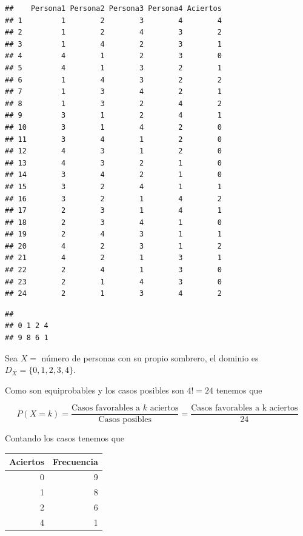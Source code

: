 \documentclass[
]{article}
\newenvironment{Shaded}{\begin{snugshade}}{\end{snugshade}}
\newcommand{\KeywordTok}[1]{\textcolor[rgb]{0.13,0.29,0.53}{\textbf{#1}}}
\newcommand{\NormalTok}[1]{#1}
\newcommand{\OperatorTok}[1]{\textcolor[rgb]{0.81,0.36,0.00}{\textbf{#1}}}
\begin{document}
\begin{verbatim}
##    Persona1 Persona2 Persona3 Persona4 Aciertos
## 1         1        2        3        4        4
## 2         1        2        4        3        2
## 3         1        4        2        3        1
## 4         4        1        2        3        0
## 5         4        1        3        2        1
## 6         1        4        3        2        2
## 7         1        3        4        2        1
## 8         1        3        2        4        2
## 9         3        1        2        4        1
## 10        3        1        4        2        0
## 11        3        4        1        2        0
## 12        4        3        1        2        0
## 13        4        3        2        1        0
## 14        3        4        2        1        0
## 15        3        2        4        1        1
## 16        3        2        1        4        2
## 17        2        3        1        4        1
## 18        2        3        4        1        0
## 19        2        4        3        1        1
## 20        4        2        3        1        2
## 21        4        2        1        3        1
## 22        2        4        1        3        0
## 23        2        1        4        3        0
## 24        2        1        3        4        2
\end{verbatim}

\begin{Shaded}
\end{Shaded}

\begin{verbatim}
## 
## 0 1 2 4 
## 9 8 6 1
\end{verbatim}

Sea \(X=\) número de personas con su propio sombrero, el dominio es
\(D_X=\{0,1,2,3,4\}\).

Como son equiprobables y los casos posibles son \(4!=24\) tenemos que

\[P(X=k)=\frac{\mbox{Casos favorables a $k$ aciertos}}{\mbox{Casos posibles}}=\frac{\mbox{Casos favorables a k aciertos}}{24}\]

Contando los casos tenemos que

\begin{longtable}[]{@{}rr@{}}
\toprule
Aciertos & Frecuencia\tabularnewline
\midrule
\endhead
0 & 9\tabularnewline
1 & 8\tabularnewline
2 & 6\tabularnewline
4 & 1\tabularnewline
\bottomrule
\end{longtable}
\end{document}
